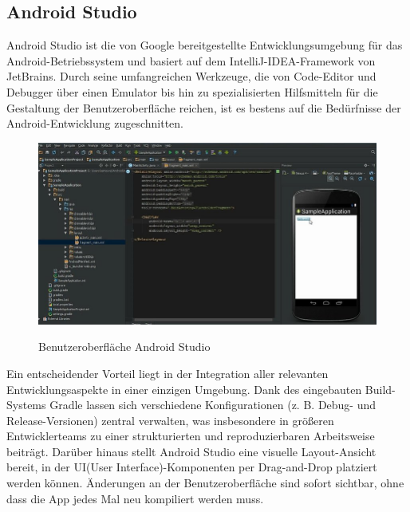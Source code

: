 \documentclass[a4paper, 12pt]{article} %
\begin{document}
\subsection{Android Studio}


\begin{spacing}{1.8}  %
\fontsize{14pt}{15pt}\selectfont  %

Android Studio ist die von Google bereitgestellte Entwicklungsumgebung für das Android-Betriebssystem 
und basiert auf dem IntelliJ-IDEA-Framework\cite{jetbrains_android_application} von JetBrains. Durch seine umfangreichen Werkzeuge, die von Code-Editor und Debugger 
über einen Emulator bis hin zu spezialisierten Hilfsmitteln für die Gestaltung der 
Benutzeroberfläche reichen, ist es bestens auf die Bedürfnisse der Android-Entwicklung zugeschnitten.

\begin{figure}[H]
    \includegraphics[width=1\linewidth]{images/Android-Studio-user-interface-during-the-development-of-Android-mobile-App-Figure.jpg}\\[1ex]
    \centering
    \caption{Benutzeroberfläche Android Studio\cite{researchgate_android_studio}}
    \label{ABBILDUNG 76}
\end{figure}

Ein entscheidender Vorteil liegt in der Integration aller relevanten Entwicklungsaspekte in einer einzigen
 Umgebung. Dank des eingebauten Build-Systems Gradle lassen sich verschiedene Konfigurationen (z. B. Debug- und Release-Versionen) 
 zentral verwalten, was insbesondere in größeren Entwicklerteams zu einer strukturierten und reproduzierbaren Arbeitsweise beiträgt. 
 Darüber hinaus stellt Android Studio eine visuelle Layout-Ansicht bereit, in der UI(User Interface)-Komponenten per Drag-and-Drop platziert werden können. 
 Änderungen an der Benutzeroberfläche sind sofort sichtbar, ohne dass die App jedes Mal neu kompiliert werden muss.


\end{spacing}
\end{document}
